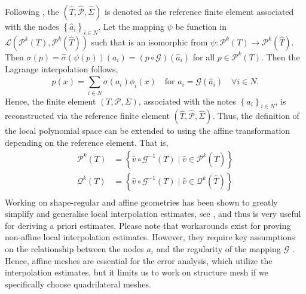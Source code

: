 \documentclass[11pt]{article}
\theoremstyle{remark}
\numberwithin{equation}{section}
\begin{document}
Following \cite[Example 9.4]{ErnGuermond2021}, the $ ( \hat{T}, \hat{\mathcal{P} }, \hat{\Sigma} ) $ is denoted as the reference finite element associated with the nodes $\left\{ \hat{a}_{i} \right\}_{i\in N} $. Let the mapping $\psi $ be function in $\mathcal{L}( \mathcal{P} ^{k}( T), \mathcal{P} ^{k}(\hat{T}
)  )  $ such that is an isomorphic from  $ \psi : \mathcal{P} ^{k}( T) \to \mathcal{P} ^{k}( \hat{T})   $.  Then $\sigma ( p) = \hat{\sigma }( \psi ( p) ) (a_{i} )  = ( p \circ \mathcal{G} )( \hat{a}_{i})      $ for all $p \in \mathcal{P}^{k}( T)  $.
Then the Lagrange interpolation follows,  \[
    p (x) = \sum_{i \in N }^{} \sigma ( a_{i}) \phi_{i}( x) \quad \text{for } a_{i} = \mathcal{G}( \hat{a}_{i}) \quad  \forall i \in N     .
\]
Hence, the finite element $( T, \mathcal{P}, \Sigma  ) $, associated with the notes $\left\{ a_{i} \right\}_{i\in N} $, is reconstructed via the reference finite element $( \hat{T}, \hat{\mathcal{P} }, \hat{\Sigma} ) $.
Thus, the definition of the local polynomial space can be extended to using the affine transformation depending on the reference element.
That is, \[
    \begin{split}
\mathcal{P}^{k}( T) & = \left\{ \hat{v} \circ  \mathcal{G}^{-1}( T)   \mid  \hat{v} \in \mathcal{P}^{k}( \hat{T})      \right\} \\
\mathcal{Q}^{k}( T) & = \left\{ \hat{v} \circ  \mathcal{G}^{-1}( T)     \mid  \hat{v} \in \mathcal{Q}^{k}( \hat{T})      \right\} \\
    \end{split}
\]
Working on shape-regular and affine geometries has been shown to greatly simplify and generalise local interpolation estimates, see \cite[Theorem 11.12]{ErnGuermond2021}, and thus is very useful for deriving a priori estimates.
Please note that workarounds exist for proving non-affine local interpolation estimates. However, they require key assumptions on the relationship between the nodes $a_{i}$ and the regularity of the mapping $\mathcal{G} $ \cite[Chapter 13]{ErnGuermond2021}.
Hence, affine meshes are essential for the error analysis, which utilize the interpolation estimates, but it limits us to work on structure mesh if we specifically choose quadrilateral meshes.
\end{document}
